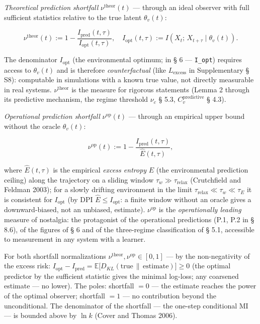 \documentclass[pdflatex,sn-mathphys-ay]{sn-jnl}
\begin{document}
\emph{Theoretical prediction shortfall} \(\nu^{\text{theor}}(t)\) --- through an ideal observer with full sufficient statistics relative to the true latent \(\theta_v(t)\):



\begin{equation}\nu^{\text{theor}}(t) := 1 - \frac{I_{\text{pred}}(t, \tau)}{I_{\text{opt}}(t, \tau)}, \quad I_{\text{opt}}(t,\tau) := I\!\left(X_t;\, X_{t+\tau} \mid \theta_v(t)\right). \tag{7}\end{equation}



The denominator \(I_{\text{opt}}\) (the environmental optimum; in § 6 --- \texttt{I\_opt}) requires access to \(\theta_v(t)\) and is therefore \emph{counterfactual} (like \(L_{\text{excess}}\) in Supplementary § S8): computable in simulations with a known true value, not directly measurable in real systems. \(\nu^{\text{theor}}\) is the measure for rigorous statements (Lemma 2 through its predictive mechanism, the regime threshold \(\nu_c\) § 5.3, \(C_v^{\text{predictive}}\) § 4.3).



\emph{Operational prediction shortfall} \(\nu^{\text{op}}(t)\) --- through an empirical upper bound without the oracle \(\theta_v(t)\):



\begin{equation}\nu^{\text{op}}(t) := 1 - \frac{I_{\text{pred}}(t, \tau)}{\hat E(t, \tau)}, \tag{7'}\end{equation}



where \(\hat E(t, \tau)\) is the empirical \emph{excess entropy} \(E\) (the environmental prediction ceiling) along the trajectory on a sliding window \(\tau_w \gg \tau_{\text{relax}}\) (Crutchfield and Feldman 2003); for a slowly drifting environment in the limit \(\tau_{\text{relax}} \ll \tau_w \ll \tau_E\) it is consistent for \(I_{\text{opt}}\) (by DPI \(\hat E \le I_{\text{opt}}\): a finite window without an oracle gives a downward-biased, not an unbiased, estimate). \(\nu^{\text{op}}\) is the \emph{operationally leading} measure of nostalgia: the protagonist of the operational predictions (P.1, P.2 in § 8.6), of the figures of § 6 and of the three-regime classification of § 5.1, accessible to measurement in any system with a learner.



For both shortfall normalizations \(\nu^{\text{theor}}, \nu^{\text{op}} \in [0, 1]\) --- by the non-negativity of the excess risk: \(I_{\text{opt}} - I_{\text{pred}} = \mathbb{E}\bigl[D_{KL}(\text{true} \,\|\, \text{estimate})\bigr] \ge 0\) (the optimal predictor by the sufficient statistic gives the minimal log-loss; any coarsened estimate --- no lower). The poles: shortfall \(= 0\) --- the estimate reaches the power of the optimal observer; shortfall \(= 1\) --- no contribution beyond the unconditional. The denominator of the shortfall --- the one-step conditional MI --- is bounded above by \(\ln k\) (Cover and Thomas 2006).
\end{document}
